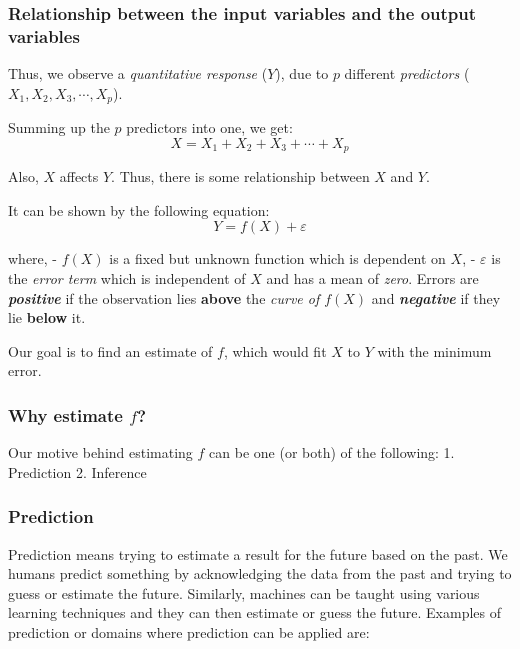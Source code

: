 \documentclass[11pt]{article}
\begin{document}
    \hypertarget{relationship-between-the-input-variables-and-the-output-variables}{%
\subsubsection{Relationship between the input variables and the output
variables}\label{relationship-between-the-input-variables-and-the-output-variables}}

    Thus, we observe a \emph{quantitative response} (\(Y\)), due to
\emph{\(p\)} different \emph{predictors}
(\(X_{1}, X_{2}, X_{3}, \cdots , X_{p}\)).

Summing up the \(p\) predictors into one, we get: \[
X = X_{1} + X_{2} + X_{3} + \cdots + X_{p}
\]

Also, \(X\) affects \(Y\). Thus, there is some relationship between
\(X\) and \(Y\).

It can be shown by the following equation: \[
Y = f(X) + \varepsilon
\]

where, - \(f(X)\) is a fixed but unknown function which is dependent on
\(X\), - \(\varepsilon\) is the \emph{error term} which is independent
of \(X\) and has a mean of \emph{zero}. Errors are
\textbf{\emph{positive}} if the observation lies \textbf{above} the
\emph{curve of \(f(X)\)} and \textbf{\emph{negative}} if they lie
\textbf{below} it.

    Our goal is to find an estimate of \(f\), which would fit \(X\) to \(Y\)
with the minimum error.

    \hypertarget{why-estimate-f}{%
\subsubsection{\texorpdfstring{Why estimate
\(f\)?}{Why estimate f?}}\label{why-estimate-f}}

    Our motive behind estimating \(f\) can be one (or both) of the
following: 1. Prediction 2. Inference

    \hypertarget{prediction}{%
\subsubsection{Prediction}\label{prediction}}

Prediction means trying to estimate a result for the future based on the
past. We humans predict something by acknowledging the data from the
past and trying to guess or estimate the future. Similarly, machines can
be taught using various learning techniques and they can then estimate
or guess the future. Examples of prediction or domains where prediction
can be applied are:
\end{document}
